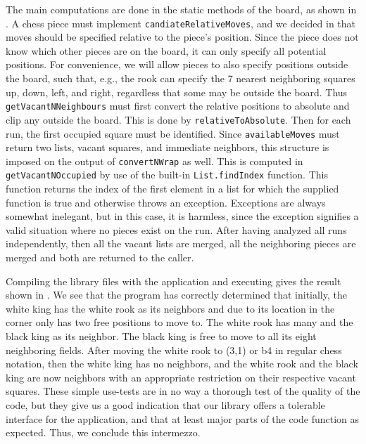 The main computations are done in the static methods of the board, as shown in . 
%
%
A chess piece must implement \lstinline{candiateRelativeMoves}, and we decided in  that moves should be specified relative to the piece's position. Since the piece does not know which other pieces are on the board, it can only specify all potential positions. For convenience, we will allow pieces to also specify positions outside the board, such that, e.g., the rook can specify the 7 nearest neighboring squares up, down, left, and right, regardless that some may be outside the board. Thus \lstinline{getVacantNNeighbours} must first convert the relative positions to absolute and clip any outside the board. This is done by \lstinline{relativeToAbsolute}. Then for each run, the first occupied square must be identified. Since \lstinline{availableMoves} must return two lists, vacant squares, and immediate neighbors, this structure is imposed on the output of \lstinline{convertNWrap} as well. This is computed in \lstinline{getVacantNOccupied} by use of the built-in \lstinline{List.findIndex} function. This function returns the index of the first element in a list for which the supplied function is true and otherwise throws an exception. Exceptions are always somewhat inelegant, but in this case, it is harmless, since the exception signifies a valid situation where no pieces exist on the run. After having analyzed all runs independently, then all the vacant lists are merged, all the neighboring pieces are merged and both are returned to the caller.

Compiling the library files with the application and executing gives the result shown in .
%
%
We see that the program has correctly determined that initially, the white king has the white rook as its neighbors and due to its location in the corner only has two free positions to move to. The white rook has many and the black king as its neighbor. The black king is free to move to all its eight neighboring fields. After moving the white rook to (3,1) or b4 in regular chess notation, then the white king has no neighbors, and the white rook and the black king are now neighbors with an appropriate restriction on their respective vacant squares. These simple use-tests are in no way a thorough test of the quality of the code, but they give us a good indication that our library offers a tolerable interface for the application, and that at least major parts of the code function as expected. Thus, we conclude this intermezzo.


